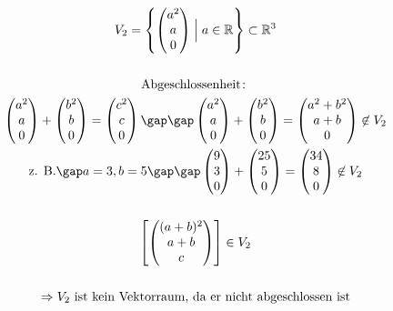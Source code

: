 \begin{gather*}
  V_2 = \left\{\begin{pmatrix}a^2 \\ a \\ 0\end{pmatrix} \Bigm| a \in \mathbb{R} \right\} \subset \mathbb{R}^3 \\\\
  \text{Abgeschlossenheit} \colon \\
  \begin{pmatrix}a^2 \\ a \\ 0\end{pmatrix} + \begin{pmatrix}b^2 \\ b \\ 0\end{pmatrix} = \begin{pmatrix}c^2 \\ c \\ 0\end{pmatrix} \gap\gap \begin{pmatrix}a^2 \\ a \\ 0\end{pmatrix} + \begin{pmatrix}b^2 \\ b \\ 0\end{pmatrix} = \begin{pmatrix}a^2 + b^2 \\ a + b \\ 0\end{pmatrix} \not\in V_2 \\
  \text{z. B.}\gap a = 3, b = 5 \gap\gap \begin{pmatrix}9 \\ 3 \\ 0\end{pmatrix} + \begin{pmatrix}25 \\ 5 \\ 0\end{pmatrix} = \begin{pmatrix}34 \\ 8 \\ 0\end{pmatrix} \not\in V_2 \\\\
  \left[\begin{pmatrix}(a + b)^2 \\ a + b \\ c\end{pmatrix}\right] \in V_2 \\\\
  \Rightarrow \text{$V_2$ ist kein Vektorraum, da er nicht abgeschlossen ist}
\end{gather*}
